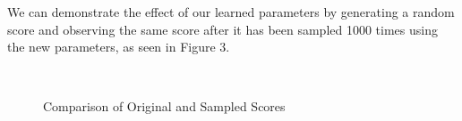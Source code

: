 \documentclass{article}
\begin{document}
We can demonstrate the effect of our learned parameters by generating a random score and observing the same score after it has been sampled 1000 times using the new parameters, as seen in Figure 3.

\begin{figure}
\centering
\mbox{
\quad
{}
}
\centering
\caption{Comparison of Original and Sampled Scores}
\label{fig-all}
\end{figure}
\end{document}
